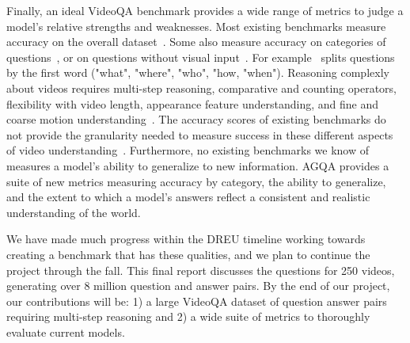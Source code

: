 \documentclass[10pt,twocolumn,letterpaper]{article}
\newcommand{\mgm}[1]{{\color{cyan}{mgm: #1}}}
\begin{document}
Finally, an ideal VideoQA benchmark provides a wide range of metrics to judge a model's relative strengths and weaknesses. Most existing benchmarks measure accuracy on the overall dataset~\cite{maharaj2017dataset,jang2017tgif,xu2017video,maharaj2017dataset,zeng2016leveraging,yu2019activitynet}. Some also measure accuracy on categories of questions~\cite{jang2017tgif,xu2017video,yu2019activitynet}, or on questions without visual input~\cite{zeng2016leveraging}. For example~\cite{xu2017video} splits questions by the first word ("what", "where", "who", "how, "when"). %
Reasoning complexly about videos requires multi-step reasoning, comparative and counting operators, flexibility with video length, appearance feature understanding, and fine and coarse motion understanding~\cite{le2020hierarchical,fan2019heterogeneous}. The accuracy scores of existing benchmarks do not provide the granularity needed to measure success in these different aspects of video understanding~\cite{fan2019heterogeneous,le2020hierarchical}. Furthermore, no existing benchmarks we know of measures a model's ability to generalize to new information. AGQA provides a suite of new metrics measuring accuracy by category, the ability to generalize, and the extent to which a model's answers reflect a consistent and realistic understanding of the world. \mgm{Will need to adjsut this based on the metrics that I got done. For example, didn't do entailments which was the crux of the "consistent worldview" part. So I probbaly want to shift the focus to measuring compositional reasoning}

We have made much progress within the DREU timeline working towards creating a benchmark that has these qualities, and we plan to continue the project through the fall. This final report discusses the questions for 250 videos, generating over 8 million question and answer pairs. By the end of our project, our contributions will be: 1) a large VideoQA dataset of question answer pairs requiring multi-step reasoning and 2) a wide suite of metrics to thoroughly evaluate current models. \mgm{delete this part and replace with model results}


\end{document}
